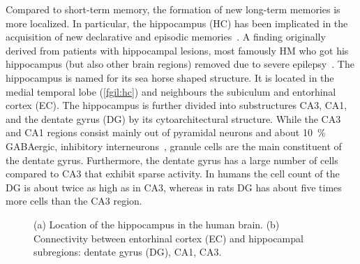 Compared to short-term memory, the formation of new long-term memories is more localized.
In particular, the hippocampus (HC) has been implicated in the acquisition of new declarative and episodic memories~\parencite{eichenbaum2001-1}.
A finding originally derived from patients with hippocampal lesions, most famously HM who got his hippocampus (but also other brain regions) removed due to severe epilepsy~\parencite{penfield1958,scoville1957-1,squire2009}.
The hippocampus is named for its sea horse shaped structure.
It is located in the medial temporal lobe (\cref{fgil:hc}) and neighbours the subiculum and entorhinal cortex (EC).
The hippocampus is further divided into substructures CA3, CA1, and the dentate gyrus (DG) by its cytoarchitectural structure.
While the CA3 and CA1 regions consist mainly out of pyramidal neurons and about \SI{10}{\percent} GABAergic, inhibitory interneurons~\parencite{Freund1996}, granule cells are the main constituent of the dentate gyrus.
Furthermore, the dentate gyrus has a large number of cells compared to CA3 that exhibit sparse activity.
In humans the cell count of the DG is about twice as high as in CA3, whereas in rats DG has about five times more cells than the CA3 region.
\begin{figure}
    \hfill
    \hfill
    \hfill
    \caption{(a) Location of the hippocampus in the human brain. (b) Connectivity between entorhinal cortex (EC) and hippocampal subregions: dentate gyrus (DG), CA1, CA3.}\label{fig:hc}
\end{figure}

